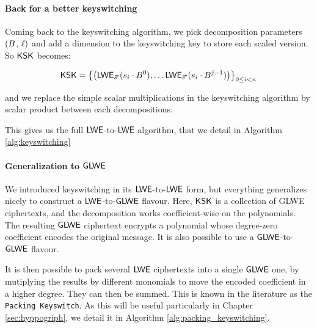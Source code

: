 \paragraph{Back for a better keyswitching}

Coming back to the keyswitching algorithm, we pick decomposition parameters $(B$, $\ell)$ and add a dimension to the keyswitching key to store each scaled version. So $\textsf{KSK}$ becomes:

\[
	\textsf{KSK} = \left \lbrace \left ( \textsf{LWE}_{\vec s'} (s_i \cdot B^0), \dots  \textsf{LWE}_{\vec s'} (s_i \cdot B^{j-1}) \right ) \right \rbrace_{0 \le i < n}
\]


and we replace the simple scalar multiplications in the keyswitching algorithm by scalar product between each decompositions. %


This gives us the full $\textsf{LWE}$-to-$\textsf{LWE}$ algorithm, that we detail in Algorithm \ref{alg:keyswitching}








\paragraph{Generalization to $\textsf{GLWE}$}


We introduced keyswitching in its $\textsf{LWE}$-to-$\textsf{LWE}$ form, but everything generalizes nicely to construct a $\textsf{LWE}$-to-$\textsf{GLWE}$ flavour. Here, $\textsf{KSK}$ is a collection of GLWE ciphertexts, and the decomposition works coefficient-wise on the polynomials. The resulting $\textsf{GLWE}$ ciphertext encrypts a polynomial whose degree-zero coefficient encodes the original message. It is also possible to use a $\textsf{GLWE}$-to-$\textsf{GLWE}$ flavour.


It is then possible to pack several $\textsf{LWE}$ ciphertexts into a single $\textsf{GLWE}$ one, by mutiplying the results by different monomials to move the encoded coefficient in a higher degree. They can then be summed. This is known in the literature as the \texttt{Packing Keyswitch}. As this will be useful particularly in Chapter \ref{sec:hyppogriph}, we detail it in Algorithm \ref{alg:packing_keyswitching}.

